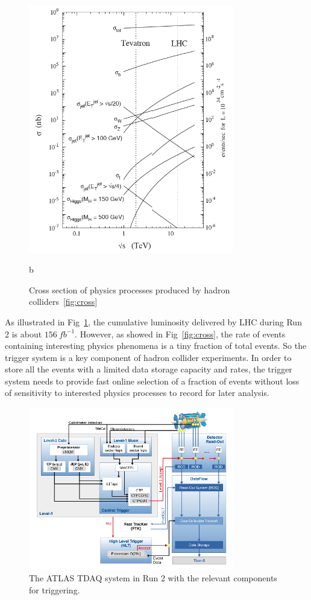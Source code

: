 \begin{figure}[htbp!]
 \centering
 \includegraphics[width=0.8\textwidth]{chapters/c4/figures/cross}
 \caption{b}
 \label{fig:cross}
 \caption{Cross section of physics processes produced by hadron colliders~\ref{fig:cross}}
\label{fig:lumi}
\end{figure}
As illustrated in Fig~\ref{fig:lumi}, the cumulative luminosity delivered by LHC during Run 2 is about $156~fb^{-1}$. However, as showed in Fig~\ref{fig:cross}, the rate of events containing interesting physics phenomena is a tiny fraction of total events. So the trigger system is a key component of hadron collider experiments. In order to store all the events with a limited data storage capacity and rates, the trigger system needs to provide fast online selection of a fraction of events without loss of sensitivity to interested physics processes to record for later analysis.
\begin{figure}[htbp!]
 \begin{center}
 \includegraphics[width=0.8\textwidth]{chapters/c4/figures/TDAQ}
 \end{center}
 \caption{The ATLAS TDAQ system in Run 2 with the relevant components for triggering. }
 \label{fig:TDAQ}
\end{figure}

